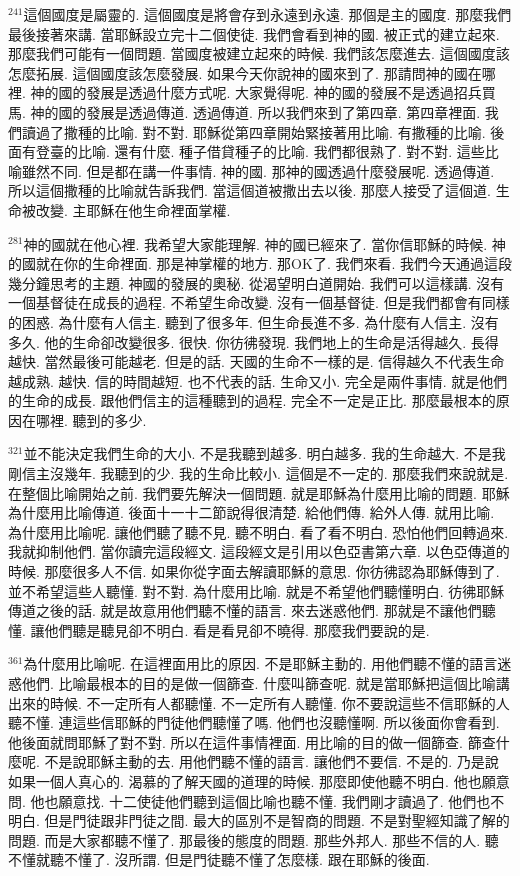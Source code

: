 \documentclass{book}
\begin{document}
$^{241}$這個國度是屬靈的.
這個國度是將會存到永遠到永遠.
那個是主的國度.
那麼我們最後接著來講.
當耶穌設立完十二個使徒.
我們會看到神的國.
被正式的建立起來.
那麼我們可能有一個問題.
當國度被建立起來的時候.
我們該怎麼進去.
這個國度該怎麼拓展.
這個國度該怎麼發展.
如果今天你說神的國來到了.
那請問神的國在哪裡.
神的國的發展是透過什麼方式呢.
大家覺得呢.
神的國的發展不是透過招兵買馬.
神的國的發展是透過傳道.
透過傳道.
所以我們來到了第四章.
第四章裡面.
我們讀過了撒種的比喻.
對不對.
耶穌從第四章開始緊接著用比喻.
有撒種的比喻.
後面有登臺的比喻.
還有什麼.
種子借貸種子的比喻.
我們都很熟了.
對不對.
這些比喻雖然不同.
但是都在講一件事情.
神的國.
那神的國透過什麼發展呢.
透過傳道.
所以這個撒種的比喻就告訴我們.
當這個道被撒出去以後.
那麼人接受了這個道.
生命被改變.
主耶穌在他生命裡面掌權.

$^{281}$神的國就在他心裡.
我希望大家能理解.
神的國已經來了.
當你信耶穌的時候.
神的國就在你的生命裡面.
那是神掌權的地方.
那OK了.
我們來看.
我們今天通過這段幾分鐘思考的主題.
神國的發展的奧秘.
從渴望明白道開始.
我們可以這樣講.
沒有一個基督徒在成長的過程.
不希望生命改變.
沒有一個基督徒.
但是我們都會有同樣的困惑.
為什麼有人信主.
聽到了很多年.
但生命長進不多.
為什麼有人信主.
沒有多久.
他的生命卻改變很多.
很快.
你彷彿發現.
我們地上的生命是活得越久.
長得越快.
當然最後可能越老.
但是的話.
天國的生命不一樣的是.
信得越久不代表生命越成熟.
越快.
信的時間越短.
也不代表的話.
生命又小.
完全是兩件事情.
就是他們的生命的成長.
跟他們信主的這種聽到的過程.
完全不一定是正比.
那麼最根本的原因在哪裡.
聽到的多少.

$^{321}$並不能決定我們生命的大小.
不是我聽到越多.
明白越多.
我的生命越大.
不是我剛信主沒幾年.
我聽到的少.
我的生命比較小.
這個是不一定的.
那麼我們來說就是.
在整個比喻開始之前.
我們要先解決一個問題.
就是耶穌為什麼用比喻的問題.
耶穌為什麼用比喻傳道.
後面十一十二節說得很清楚.
給他們傳.
給外人傳.
就用比喻.
為什麼用比喻呢.
讓他們聽了聽不見.
聽不明白.
看了看不明白.
恐怕他們回轉過來.
我就抑制他們.
當你讀完這段經文.
這段經文是引用以色亞書第六章.
以色亞傳道的時候.
那麼很多人不信.
如果你從字面去解讀耶穌的意思.
你彷彿認為耶穌傳到了.
並不希望這些人聽懂.
對不對.
為什麼用比喻.
就是不希望他們聽懂明白.
彷彿耶穌傳道之後的話.
就是故意用他們聽不懂的語言.
來去迷惑他們.
那就是不讓他們聽懂.
讓他們聽是聽見卻不明白.
看是看見卻不曉得.
那麼我們要說的是.

$^{361}$為什麼用比喻呢.
在這裡面用比的原因.
不是耶穌主動的.
用他們聽不懂的語言迷惑他們.
比喻最根本的目的是做一個篩查.
什麼叫篩查呢.
就是當耶穌把這個比喻講出來的時候.
不一定所有人都聽懂.
不一定所有人聽懂.
你不要說這些不信耶穌的人聽不懂.
連這些信耶穌的門徒他們聽懂了嗎.
他們也沒聽懂啊.
所以後面你會看到.
他後面就問耶穌了對不對.
所以在這件事情裡面.
用比喻的目的做一個篩查.
篩查什麼呢.
不是說耶穌主動的去.
用他們聽不懂的語言.
讓他們不要信.
不是的.
乃是說如果一個人真心的.
渴慕的了解天國的道理的時候.
那麼即使他聽不明白.
他也願意問.
他也願意找.
十二使徒他們聽到這個比喻也聽不懂.
我們剛才讀過了.
他們也不明白.
但是門徒跟非門徒之間.
最大的區別不是智商的問題.
不是對聖經知識了解的問題.
而是大家都聽不懂了.
那最後的態度的問題.
那些外邦人.
那些不信的人.
聽不懂就聽不懂了.
沒所謂.
但是門徒聽不懂了怎麼樣.
跟在耶穌的後面.
\end{document}
